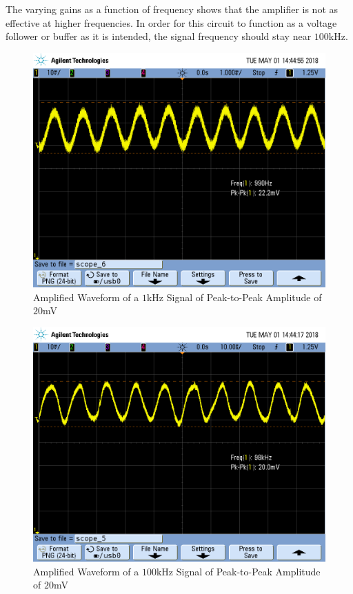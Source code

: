 \FloatBarrier

The varying gains as a function of frequency shows that the amplifier is not as effective at higher frequencies. In order for this circuit to function as a voltage follower or buffer as it is intended, the signal frequency should stay near $100$\si{\kilo\hertz}.

\FloatBarrier

\begin{figure}[h!]
	\centering
	\includegraphics[scale=0.45]{./images/SCOPE_6.PNG}
	\caption{Amplified Waveform of a $1$\si{\kilo\hertz} Signal of Peak-to-Peak Amplitude of $20$\si{\milli\volt}}
	\label{fig:SCOPE_6}
\end{figure}

\FloatBarrier

\begin{figure}[h!]
	\centering
	\includegraphics[scale=0.45]{./images/SCOPE_5.PNG}
	\caption{Amplified Waveform of a $100$\si{\kilo\hertz} Signal of Peak-to-Peak Amplitude of $20$\si{\milli\volt}}
	\label{fig:SCOPE_5}
\end{figure}

